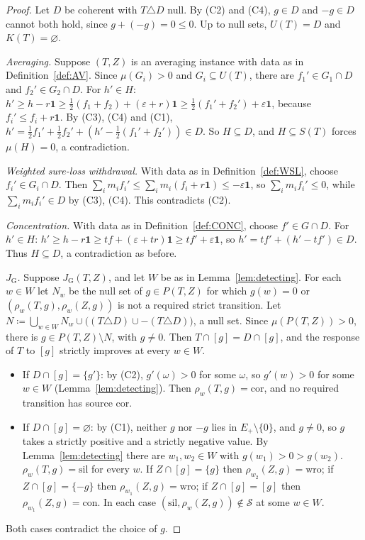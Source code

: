 \documentclass[11pt]{article}
\theoremstyle{definition}
\newcommand{\one}{\mathbf 1}
\newcommand{\cor}{\mathrm{cor}}
\newcommand{\sil}{\mathrm{sil}}
\newcommand{\wro}{\mathrm{wro}}
\newcommand{\con}{\mathrm{con}}
\newcommand{\GU}{\mathrm{G}}
\begin{document}
\begin{proof}
Let $D$ be coherent with $T\triangle D$ null. By (C2) and (C4), $g\in D$ and $-g\in D$ cannot both hold, since $g+(-g)=0\le0$. Up to null sets, $U(T)=D$ and $K(T)=\varnothing$.

\emph{Averaging.} Suppose $(T,Z)$ is an averaging instance with data as in Definition~\ref{def:AV}. Since $\mu(G_i)>0$ and $G_i\subseteq U(T)$, there are $f_1'\in G_1\cap D$ and $f_2'\in G_2\cap D$. For $h'\in H$: $h'\ge h-r\one\ge\frac12(f_1+f_2)+(\varepsilon+r)\one\ge\frac12(f_1'+f_2')+\varepsilon\one$, because $f_i'\le f_i+r\one$. By (C3), (C4) and (C1), $h'=\frac12f_1'+\frac12f_2'+(h'-\frac12(f_1'+f_2'))\in D$. So $H\subseteq D$, and $H\subseteq S(T)$ forces $\mu(H)=0$, a contradiction.

\emph{Weighted sure-loss withdrawal.} With data as in Definition~\ref{def:WSL}, choose $f_i'\in G_i\cap D$. Then $\sum_im_if_i'\le\sum_im_i(f_i+r\one)\le-\varepsilon\one$, so $\sum_im_if_i'\le0$, while $\sum_im_if_i'\in D$ by (C3), (C4). This contradicts (C2).

\emph{Concentration.} With data as in Definition~\ref{def:CONC}, choose $f'\in G\cap D$. For $h'\in H$: $h'\ge h-r\one\ge tf+(\varepsilon+tr)\one\ge tf'+\varepsilon\one$, so $h'=tf'+(h'-tf')\in D$. Thus $H\subseteq D$, a contradiction as before.

\emph{$J_\GU$.} Suppose $J_\GU(T,Z)$, and let $W$ be as in Lemma~\ref{lem:detecting}. For each $w\in W$ let $N_w$ be the null set of $g\in P(T,Z)$ for which $g(w)=0$ or $(\rho_w(T,g),\rho_w(Z,g))$ is not a required strict transition. Let $N\coloneqq\bigcup_{w\in W}N_w\cup\bigl((T\triangle D)\cup-(T\triangle D)\bigr)$, a null set. Since $\mu(P(T,Z))>0$, there is $g\in P(T,Z)\setminus N$, with $g\ne0$. Then $T\cap[g]=D\cap[g]$, and the response of $T$ to $[g]$ strictly improves at every $w\in W$.
\begin{itemize}
\item If $D\cap[g]=\{g'\}$: by (C2), $g'(\omega)>0$ for some $\omega$, so $g'(w)>0$ for some $w\in W$ (Lemma~\ref{lem:detecting}). Then $\rho_w(T,g)=\cor$, and no required transition has source $\cor$.
\item If $D\cap[g]=\varnothing$: by (C1), neither $g$ nor $-g$ lies in $E_+\setminus\{0\}$, and $g\ne0$, so $g$ takes a strictly positive and a strictly negative value. By Lemma~\ref{lem:detecting} there are $w_1,w_2\in W$ with $g(w_1)>0>g(w_2)$. $\rho_w(T,g)=\sil$ for every $w$. If $Z\cap[g]=\{g\}$ then $\rho_{w_2}(Z,g)=\wro$; if $Z\cap[g]=\{-g\}$ then $\rho_{w_1}(Z,g)=\wro$; if $Z\cap[g]=[g]$ then $\rho_{w_1}(Z,g)=\con$. In each case $(\sil,\rho_w(Z,g))\notin\mathcal S$ at some $w\in W$.
\end{itemize}
Both cases contradict the choice of $g$.
\end{proof}
\end{document}

